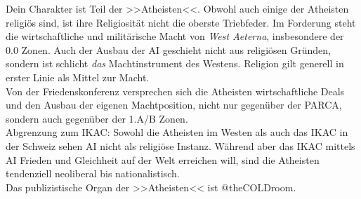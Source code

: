 Dein Charakter ist Teil der >>Atheisten<<. Obwohl auch einige der Atheisten
religiös sind, ist ihre Religiosität nicht die oberste Triebfeder. Im Forderung
steht die wirtschaftliche und militärische Macht von \emph{West Aeterna}, insbesondere der
0.0 Zonen. Auch der Ausbau der AI geschieht nicht aus religiösen Gründen,
sondern ist schlicht \emph{das} Machtinstrument des Westens. Religion gilt
generell in erster Linie als Mittel zur Macht.\\
Von der Friedenskonferenz versprechen sich die Atheisten wirtschaftliche Deals
und den Ausbau der eigenen Machtposition, nicht nur gegenüber der PARCA, sondern
auch gegenüber der 1.A/B Zonen.\\
Abgrenzung zum IKAC: Sowohl die Atheisten im Westen als auch
das IKAC in der Schweiz sehen AI nicht als religiöse Instanz. Während aber das
IKAC mittels AI Frieden und Gleichheit auf der Welt erreichen will, sind die
Atheisten tendenziell neoliberal bis nationalistisch.\\
Das publizistische Organ der >>Atheisten<< ist @theCOLDroom.
